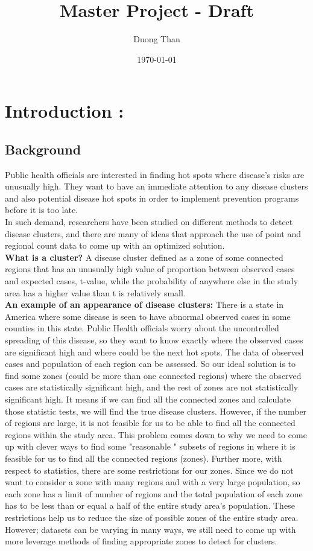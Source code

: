 \documentclass[12pt]{article}
\title{Master Project - Draft }
\author{Duong Than}
\date{\today}
\begin{document}
\maketitle	
	
		\section{Introduction :} 
		\subsection{Background} 

			Public health officials are interested in finding hot spots where disease's risks are unusually high. They want to have an immediate attention to any disease clusters and also potential disease hot spots in order to implement prevention programs before it is too late. \\ 		
In such demand, researchers have been studied on different methods to detect disease clusters, and there are many of ideas that approach the use of point and regional count data to come up with an optimized solution. \\
			\textbf{What is a cluster?} A disease cluster defined as a zone of some connected regions that has an unusually high value of proportion between observed cases and expected cases, t-value, while the probability of anywhere else in the study area has a higher value than t is relatively small. \\
			
			\textbf{An example of an appearance of disease clusters:} There is a state in America where some disease is seen to have abnormal observed cases in some counties in this state. Public Health officials worry about the uncontrolled spreading of this disease, so they want to know exactly where the observed cases are significant high and where could be the next hot spots. The data of observed cases and population of each region can be assessed. So our ideal solution is to find some zones (could be more than one connected regions) where the observed cases are statistically significant high, and the rest of zones are not statistically significant high. It means if we can find all the connected zones and calculate those statistic tests, we will find the true disease clusters. However, if the number of regions are large, it is not feasible for us to be able to find all the connected regions within the study area. This problem comes down to why we need to come up with clever ways to find some "reasonable " subsets of regions in where it is feasible for us to find all the connected regions (zones). Further more, with respect to statistics, there are some restrictions for our zones. Since we do not want to consider a zone with many regions and with a very large population, so each zone has a limit of number of regions and the total population of each zone has to be less than or equal a half of the entire study area's population. These restrictions help us to reduce the size of possible zones of the entire study area. However; datasets can be varying in many ways, we still need to come up with more leverage methods of finding appropriate zones to detect for clusters. \\       
			
\end{document}
